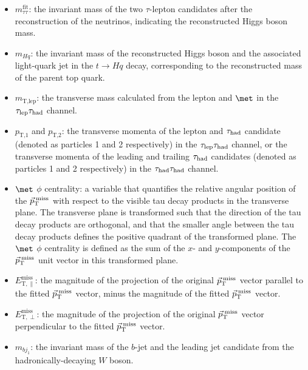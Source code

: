 \begin{itemize}
\item $m_{\tau\tau}^{\text{fit}}$: the invariant mass of the two $\tau$-lepton candidates after the reconstruction of the neutrinos, indicating the reconstructed Higgs boson mass.
\item $m_{Hq}$: the invariant mass of the reconstructed Higgs boson and the associated light-quark jet in the $t \to Hq$ decay, corresponding to the reconstructed mass of the parent top quark.
\item $m_{\text{T,lep}}$: the transverse mass calculated from the lepton and $\met$ in the $\tau_{\mathrm{lep}} \tau_{\mathrm{had}}$ channel.
\item $p_{\text{T,1}}$ and $p_{\text{T,2}}$:  the transverse momenta of the lepton and $\tau_{\mathrm{had}}$ candidate (denoted as particles 1 and 2 respectively) in the $\tau_{\mathrm{lep}} \tau_{\mathrm{had}}$ channel, or the transverse momenta of the leading and trailing $\tau_{\mathrm{had}}$ candidates (denoted as particles 1 and 2 respectively) in the $\tau_{\mathrm{had}} \tau_{\mathrm{had}}$ channel.
\item $\met$ $\phi$ centrality: a variable that quantifies the relative angular position of the $\vec{p}_\textrm{T}^\textrm{\;miss}$ with respect to the 
visible tau decay products in the transverse plane. The transverse plane is transformed such that the direction of the tau decay products are 
orthogonal, and that the smaller angle between the tau decay products defines the positive quadrant of the transformed plane. 
The $\met$ $\phi$ centrality is defined as the sum of the $x$- and $y$-components of the $\vec{p}_\textrm{T}^\textrm{\;miss}$ unit vector in this transformed plane.
\item $E_{\text{T},\parallel}^{\text{miss}}$: the magnitude of the projection of the original $\vec{p}_\textrm{T}^\textrm{\;miss}$ vector parallel to the fitted $\vec{p}_\textrm{T}^\textrm{\;miss}$ vector, minus 
the magnitude of the fitted $\vec{p}_\textrm{T}^\textrm{\;miss}$ vector.
\item $E_{\text{T},\perp}^{\text{miss}}$: the magnitude of the projection of the original $\vec{p}_\textrm{T}^\textrm{\;miss}$ vector perpendicular to the fitted $\vec{p}_\textrm{T}^\textrm{\;miss}$ vector.
\item $m_{b j_1}$: the invariant mass of the $b$-jet and the leading jet candidate from the hadronically-decaying $W$ boson.

\end{itemize}
